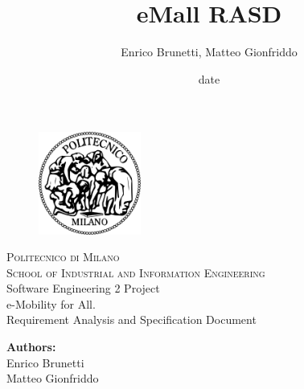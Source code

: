 \documentclass[a4paper]{report}
\begin{document}
\titleformat{\chapter}[hang] 
{\normalfont\huge\bfseries}{\thechapter}{1em}{} 

\title{eMall RASD}
\author{Enrico Brunetti, Matteo Gionfriddo}
\date{date} %

\begin{titlepage}
\begin{figure}[t]
\centering
\includegraphics[width=0.3\textwidth]{Logo}
\end{figure}
\begin{center}
    \textsc{ \LARGE{Politecnico di Milano \\}}
	\textsc{ \Large {School of Industrial and Information Engineering\\ }}
	\vspace{3mm}
	\textnormal{ \Large{Software Engineering 2 Project\\}}
	\vspace{30mm}
	\fontsize{10mm}{7mm}\selectfont 
    \textup{e-Mobility for All.}\\
    \textnormal{ \LARGE{Requirement Analysis and Specification Document\\}}
\end{center}

\vspace{18mm}

\begin{center}
    \textnormal{\large{\bf Authors:\\}}
	{\large Enrico Brunetti \\ Matteo Gionfriddo }
	\fontsize{10mm}{5mm}\selectfont 
\end{center}
\vspace{15mm}


\end{titlepage}
\end{document}
